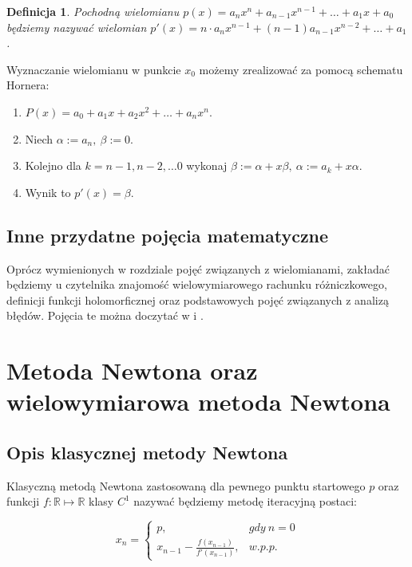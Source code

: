 \documentclass{article}
\newtheorem{definicja}{Definicja}
\begin{document}
\begin{definicja}
Pochodną wielomianu $p(x) = a_nx^n + a_{n-1}x^{n-1} + \ldots + a_1x + a_0$ będziemy nazywać wielomian $p'(x) = 	n \cdot a_n x^{n-1} + (n-1) a_{n-1}x^{n-2} + \ldots +  a_1$.
\end{definicja}

Wyznaczanie wielomianu w punkcie $x_0$ możemy zrealizować za pomocą schematu Hornera:

\begin{enumerate}
\item $P(x) = a_0 + a_1 x + a_2 x^2 + \ldots + a_n x^n$.
\item Niech $\alpha := a_n, \ \beta := 0$.
\item Kolejno dla $k = n-1, n-2, \ldots 0$ wykonaj $\beta := \alpha + x \beta, \ \alpha := a_k + x \alpha.$

\item Wynik to $p'(x) = \beta$.
\end{enumerate}

\subsection{Inne przydatne pojęcia matematyczne}

Oprócz wymienionych w rozdziale pojęć związanych z wielomianami, zakładać będziemy u czytelnika znajomość wielowymiarowego rachunku różniczkowego, definicji funkcji holomorficznej oraz podstawowych pojęć związanych z analizą błędów. Pojęcia te można doczytać w \cite{leja} i \cite{kincaid}. 

\section{Metoda Newtona oraz wielowymiarowa metoda Newtona}

\subsection{Opis klasycznej metody Newtona}

Klasyczną metodą Newtona zastosowaną dla pewnego punktu startowego $p$ oraz funkcji $f : \mathbb{R} \mapsto \mathbb{R}$ klasy $C^{1}$ nazywać będziemy metodę iteracyjną postaci:

$$
x_n = \left\{\begin{matrix}
p, & gdy \ n = 0\\ 
x_{n-1} - \frac{f(x_{n-1})}{f'(x_{n-1})}, & w.p.p. 
\end{matrix}\right.
$$
\end{document}
